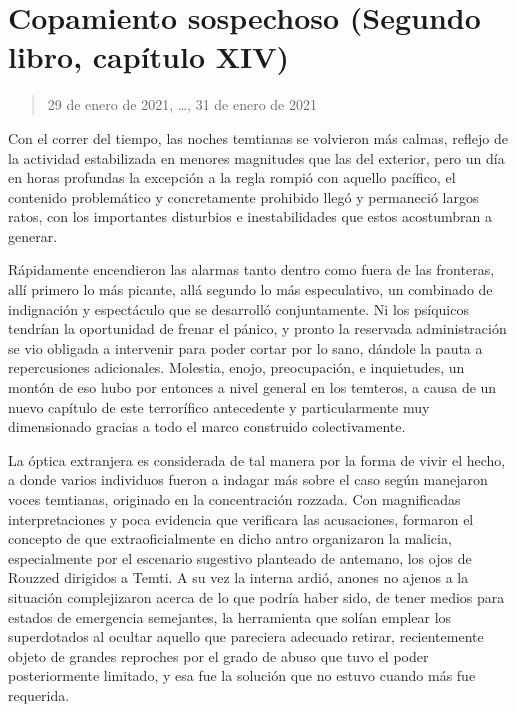 \documentclass[
]{book}
\begin{document}
\hypertarget{copamiento-sospechoso-segundo-libro-capuxedtulo-xiv}{%
\section{Copamiento sospechoso (Segundo libro, capítulo XIV)}\label{copamiento-sospechoso-segundo-libro-capuxedtulo-xiv}}

\begin{quote}
29 de enero de 2021, \ldots, 31 de enero de 2021
\end{quote}

Con el correr del tiempo, las noches temtianas se volvieron más calmas, reflejo de la actividad estabilizada en menores magnitudes que las del exterior, pero un día en horas profundas la excepción a la regla rompió con aquello pacífico, el contenido problemático y concretamente prohibido llegó y permaneció largos ratos, con los importantes disturbios e inestabilidades que estos acostumbran a generar.

Rápidamente encendieron las alarmas tanto dentro como fuera de las fronteras, allí primero lo más picante, allá segundo lo más especulativo, un combinado de indignación y espectáculo que se desarrolló conjuntamente. Ni los psíquicos tendrían la oportunidad de frenar el pánico, y pronto la reservada administración se vio obligada a intervenir para poder cortar por lo sano, dándole la pauta a repercusiones adicionales. Molestia, enojo, preocupación, e inquietudes, un montón de eso hubo por entonces a nivel general en los temteros, a causa de un nuevo capítulo de este terrorífico antecedente y particularmente muy dimensionado gracias a todo el marco construido colectivamente.

La óptica extranjera es considerada de tal manera por la forma de vivir el hecho, a donde varios individuos fueron a indagar más sobre el caso según manejaron voces temtianas, originado en la concentración rozzada. Con magnificadas interpretaciones y poca evidencia que verificara las acusaciones, formaron el concepto de que extraoficialmente en dicho antro organizaron la malicia, especialmente por el escenario sugestivo planteado de antemano, los ojos de Rouzzed dirigidos a Temti. A su vez la interna ardió, anones no ajenos a la situación complejizaron acerca de lo que podría haber sido, de tener medios para estados de emergencia semejantes, la herramienta que solían emplear los superdotados al ocultar aquello que pareciera adecuado retirar, recientemente objeto de grandes reproches por el grado de abuso que tuvo el poder posteriormente limitado, y esa fue la solución que no estuvo cuando más fue requerida.
\end{document}
